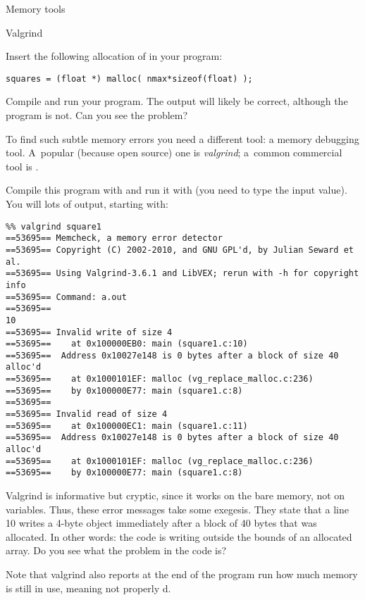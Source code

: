  {Memory tools}

 {Valgrind}
\label{sec:valgrind}

Insert the following allocation of  in your program:
\begin{verbatim}
squares = (float *) malloc( nmax*sizeof(float) );
\end{verbatim}
Compile and run your program. The output will likely be correct,
although the program is not. Can you see the problem?


To find such subtle memory errors you need a different tool: a memory
debugging tool. A~popular (because open source) one is
\emph{valgrind}; a~common commercial tool is .

%
Compile this program with  and run it with
 (you need to type the input value). You will lots
of output, starting with:
{\small
\begin{verbatim}
%% valgrind square1
==53695== Memcheck, a memory error detector
==53695== Copyright (C) 2002-2010, and GNU GPL'd, by Julian Seward et al.
==53695== Using Valgrind-3.6.1 and LibVEX; rerun with -h for copyright info
==53695== Command: a.out
==53695== 
10
==53695== Invalid write of size 4
==53695==    at 0x100000EB0: main (square1.c:10)
==53695==  Address 0x10027e148 is 0 bytes after a block of size 40 alloc'd
==53695==    at 0x1000101EF: malloc (vg_replace_malloc.c:236)
==53695==    by 0x100000E77: main (square1.c:8)
==53695== 
==53695== Invalid read of size 4
==53695==    at 0x100000EC1: main (square1.c:11)
==53695==  Address 0x10027e148 is 0 bytes after a block of size 40 alloc'd
==53695==    at 0x1000101EF: malloc (vg_replace_malloc.c:236)
==53695==    by 0x100000E77: main (square1.c:8)
\end{verbatim}
}
Valgrind is informative but cryptic, since it works on the bare
memory, not on variables. Thus, these error messages take some
exegesis. They state that a line 10 writes a 4-byte object immediately
after a block of 40 bytes that was allocated. In other words: the code
is writing outside the bounds of an allocated array. Do you see what
the problem in the code is?

Note that valgrind also reports at the end of the program run how much
memory is still in use, meaning not properly d.

